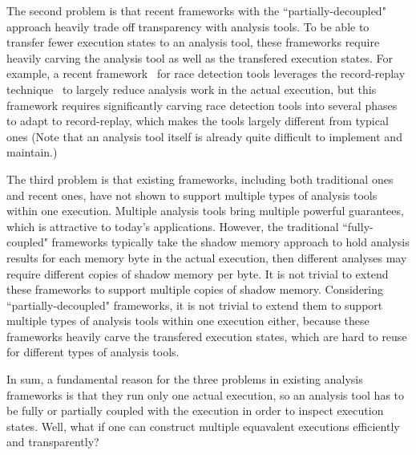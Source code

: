 The second problem is that recent frameworks with the ``partially-decoupled"
approach heavily trade off transparency with analysis tools. To be able to
transfer fewer execution states to an analysis tool, these frameworks require
heavily carving the analysis tool as well as the transfered execution states.
For example, a recent framework~\cite{wester:parallelizing:asplos13} for race
detection tools leverages the record-replay
technique~\cite{scribe:sigmetrics2010, respec:asplos10, racepro:sosp11} to
largely reduce analysis work in the actual execution, but this framework
requires significantly carving race detection tools into several phases to adapt
to record-replay, which makes the tools largely different from typical ones
(Note that an analysis tool itself is already quite difficult to implement and
maintain.)


The third problem is that existing frameworks, including both traditional ones
and recent ones, have not shown to support multiple types of analysis tools
within one execution. Multiple analysis tools bring multiple powerful
guarantees, which is attractive to today's applications. However, the
traditional ``fully-coupled" frameworks typically take the shadow memory
approach to hold analysis results for each memory byte in the actual execution,
then different analyses may require different copies of shadow memory per byte.
It is not trivial to extend these frameworks to support multiple copies of
shadow memory. Considering ``partially-decoupled" frameworks, it is not trivial
to extend them to support multiple types of analysis tools within one execution
either, because these frameworks heavily carve the transfered execution states,
which are hard to reuse for different types of analysis tools.


In sum, a fundamental reason for the three problems in existing analysis 
frameworks is that they run only one actual execution, so an analysis tool has
to be fully or partially coupled with the execution in order to inspect
execution states. Well, what if one can construct multiple equavalent
executions efficiently and transparently?






